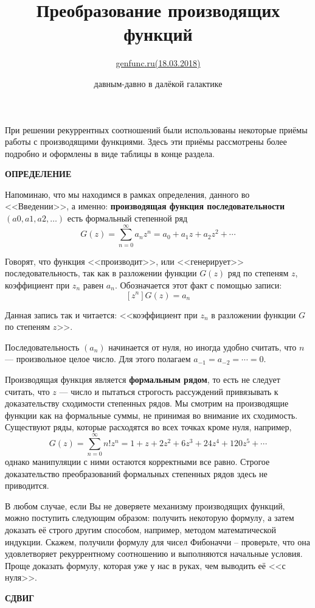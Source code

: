 \documentclass[12pt, letterpaper]{extarticle}
\title{\textbf{Преобразование производящих функций}}
\author{\href{https://web.archive.org/web/20170629072301/http://www.genfunc.ru/theory/oper/}{genfunc.ru(18.03.2018)}}
\date{давным-давно в далёкой галактике}
\begin{document}
\maketitle
При решении рекуррентных соотношений были использованы некоторые приёмы работы с производящими функциями. Здесь эти приёмы рассмотрены более подробно и оформлены в виде таблицы в конце раздела.
\begin{center}
  \textbf{ОПРЕДЕЛЕНИЕ}
\end{center}

Напоминаю, что мы находимся в рамках определения, данного во <<Введении>>, а именно: \textbf{производящая функция последовательности} $(a0, a1, a2, \dotsc)$ есть формальный степенной ряд
\[G(z)=\sum_{n=0}^{\infty} a_nz^n = a_0+a_1z+a_2z^2+\dotsb\]

Говорят, что функция <<производит>>, или <<генерирует>> последовательность, так как в разложении функции $G(z)$ ряд по степеням $z$, коэффициент при $z_n$ равен $a_n$. Обозначается этот факт с помощью записи:
\[[z^n]G(z) = a_n\]

Данная запись так и читается: <<коэффициент при $z_n$ в разложении функции $G$ по степеням $z$>>.

Последовательность $(a_n)$ начинается от нуля, но иногда удобно считать, что $n$ — произвольное целое число. Для этого полагаем $a_{-1}=a_{-2}=\dotsb=0$.

Производящая функция является \textbf{формальным рядом}, то есть не следует считать, что $z$ — число и пытаться строгость рассуждений привязывать к доказательству сходимости степенных рядов. Мы смотрим на производящие функции как на формальные суммы, не принимая во внимание их сходимость. Существуют ряды, которые расходятся во всех точках кроме нуля, например,
\[G(z) = \sum_{n=0}^{\infty}n!z^n = 1+ z+ 2z^2 + 6z^3+24z^4+120z^5+\dotsb\]
однако манипуляции с ними остаются корректными все равно. Строгое доказательство преобразований формальных степенных рядов здесь не приводится.

В любом случае, если Вы не доверяете механизму производящих функций, можно поступить следующим образом: получить некоторую формулу, а затем доказать её строго другим способом, например, методом математической индукции. Скажем, получили формулу для чисел Фибоначчи -- проверьте, что она удовлетворяет рекуррентному соотношению и выполняются начальные условия. Проще доказать формулу, которая уже у нас в руках, чем выводить её <<с нуля>>.
\newpage
\begin{center}
  \textbf{СДВИГ}
\end{center}
\end{document}
